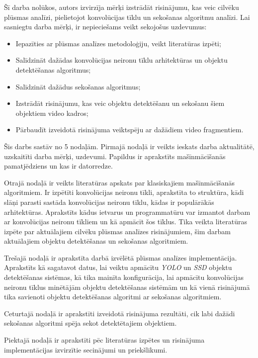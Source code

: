 Šī darba nolūkos, autors izvirzīja mērķi izstrādāt risinājumu, kas veic cilvēku plūsmas analīzi, pielietojot konvolūcijas tīklu un sekošanas algoritmu analīzi. Lai sasniegtu darba mērķi, ir nepieciešams veikt sekojošus uzdevumus:
\begin{itemize}
	\item Iepazīties ar plūsmas analīzes metodoloģiju, veikt literatūras izpēti;	
	\item Salīdzināt dažādas konvolūcijas neironu tīklu arhitektūras un objektu detektēšanas algoritmus;
	\item Salīdzināt dažādus sekošanas algoritmus;
	\item Izstrādāt risinājumu, kas veic objektu detektēšanu un sekošanu šiem objektiem video kadros;
	\item Pārbaudīt izveidotā risinājuma veiktspēju ar dažādiem video fragmentiem.	
\end{itemize}

Šis darbs sastāv no 5 nodaļām. Pirmajā nodaļā ir veikts ieskats darba aktualitātē, uzskaitīti darba mērķi, uzdevumi. Papildus ir aprakstīts  mašīnmācīšanās pamatjēdziens un kas ir datorredze.

Otrajā nodaļā ir veikts literatūras apskats par klasiskajiem mašīnmācīšanās algoritmiem. Ir izpētīti konvolūcijas neironu tīkli, aprakstīta to struktūra, kādi slāņi parasti sastāda konvolūcijas neironu tīklu, kādas ir populārākās arhitektūras. Aprakstīts kādus ietvarus un programmatūru
var izmantot darbam ar konvolūcijas neironu tīkliem un kā apmācīt šos tīklus. Tika veikta literatūras izpēte par aktuālajiem cilvēku plūsmas analīzes risinājumiem, šim darbam aktuālajiem objektu detektēšanas un sekošanas algoritmiem.

Trešajā nodaļā ir aprakstīta darbā izvēlētā plūsmas analīzes implementācija. Aprakstīts kā sagatavot datus, lai veiktu apmācītu \textit{YOLO} un \textit{SSD} objektu detektēšanas sistēmas, kā tika mainīta konfigurācija, lai apmācītu konvolūcijas neironu tīklus minētājām objektu detektēšanas sistēmām un kā vienā risinājumā tika savienoti objektu detektēšanas algoritmi ar sekošanas algoritmiem.

Ceturtajā nodaļā ir aprakstīti izveidotā risinājuma rezultāti, cik labi dažādi sekošanas algoritmi spēja sekot detektētajiem objektiem.

Piektajā nodaļā ir aprakstīti pēc literatūras izpētes un risinājuma implementācijas izvirzītie secinājumi un priekšlikumi.
\newpage
